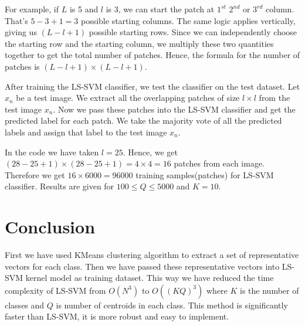 \documentclass[conference]{IEEEtran}
\begin{document}
    For example, if $L$ is 5 and $l$ is $3$, we can start the patch at $1^{st}$ $2^{nd}$ or $3^{rd}$ column.
    That's $5 - 3 + 1 = 3$ possible starting columns.
    The same logic applies vertically, giving us $(L - l + 1)$ possible starting rows.
    Since we can independently choose the starting row and the starting column, we multiply these two quantities together to get the total number of patches.
    Hence, the formula for the number of patches is $(L - l + 1) \times (L - l + 1)$.

    After training the LS-SVM classifier, we test the classifier on the test dataset.
    Let $x_{n}$ be a test image.
    We extract all the overlapping patches of size $l \times l$ from the test image $x_{n}$.
    Now we pass these patches into the LS-SVM classifier and get the predicted label for each patch.
    We take the majority vote of all the predicted labels and assign that label to the test image $x_{n}$.

    In the code we have taken $l=25$.
    Hence, we get $(28-25+1) \times (28-25+1) = 4 \times 4 = 16$ patches from each image.
    Therefore we get  $16 \times 6000 = 96000$ training samples(patches) for LS-SVM classifier.
    Results are given for $100 \leq Q \leq 5000$ and $K=10$.


    \section{Conclusion}\label{sec:conclusion}
    First we have used KMeans clustering algorithm to extract a set of representative vectors for each class.
    Then we have passed these representative vectors into LS-SVM kernel model as training dataset.
    This way we have reduced the time complexity of LS-SVM from $O(N^3)$ to $O((KQ)^3)$ where $K$ is the number of classes and $Q$ is number of centroids in each class.
    This method is significantly faster than LS-SVM, it is more robust and easy to implement.
\end{document}
